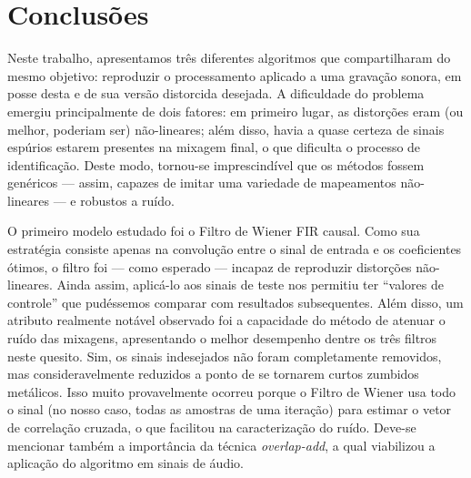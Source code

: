 \chapter{Conclusões}
\label{chapter:conclusion}

Neste trabalho, apresentamos três diferentes algoritmos que compartilharam do mesmo
objetivo: reproduzir o processamento aplicado a uma gravação sonora, em posse desta e
de sua versão distorcida desejada. A dificuldade do problema emergiu principalmente de
dois fatores: em primeiro lugar, as distorções eram (ou melhor, poderiam ser)
não-lineares; além disso, havia a quase certeza de sinais espúrios estarem presentes na
mixagem final, o que dificulta o processo de identificação. Deste modo, tornou-se
imprescindível que os métodos fossem genéricos --- assim, capazes de imitar uma
variedade de mapeamentos não-lineares --- e robustos a ruído.

O primeiro modelo estudado foi o Filtro de Wiener FIR causal. Como sua estratégia
consiste apenas na convolução entre o sinal de entrada e os coeficientes ótimos, o
filtro foi --- como esperado --- incapaz de reproduzir distorções não-lineares. Ainda
assim, aplicá-lo aos sinais de teste nos permitiu ter ``valores de controle'' que
pudéssemos comparar com resultados subsequentes. Além disso, um atributo realmente
notável observado foi a capacidade do método de atenuar o ruído das mixagens,
apresentando o melhor desempenho dentre os três filtros neste quesito. Sim, os sinais
indesejados não foram completamente removidos, mas consideravelmente reduzidos a ponto
de se tornarem curtos zumbidos metálicos. Isso muito provavelmente ocorreu porque o
Filtro de Wiener usa todo o sinal (no nosso caso, todas as amostras de uma iteração)
para estimar o vetor de correlação cruzada, o que facilitou na caracterização do ruído.
Deve-se mencionar também a importância da técnica \textit{overlap-add}, a qual
viabilizou a aplicação do algoritmo em sinais de áudio.


